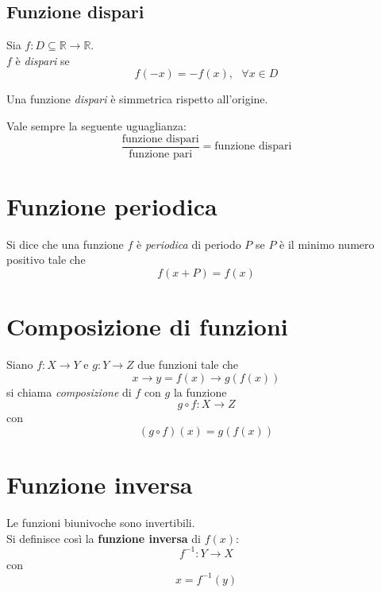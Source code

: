 \documentclass[a4paper,12pt, oneside]{book}
\begin{document}
\subsection{Funzione dispari}
\begin{definizione} Sia $f:D\subseteq \mathbb{R} \rightarrow \mathbb{R}$.\\ $f$
  è \emph{dispari} se
  \begin{equation} f(-x)=-f(x), \mbox{ } \forall x \in D
  \end{equation}
\end{definizione}
\begin{nota} Una funzione \emph{dispari} è simmetrica rispetto all'origine.
\end{nota}
\begin{shaded}
  \begin{nota} Vale sempre la seguente uguaglianza:
    $$\frac{\mbox{funzione dispari}}{\mbox{funzione pari}} = \mbox{funzione dispari}$$
  \end{nota}
\end{shaded}
\section{Funzione periodica}
\begin{definizione} Si dice che una funzione $f$ è \emph{periodica} di periodo
  $P$ se $P$ è il minimo numero positivo tale che
  \begin{equation} f(x+P) = f(x)
  \end{equation}
\end{definizione}
\section{Composizione di funzioni}
\begin{definizione} Siano $f: X \rightarrow Y$ e $g: Y \rightarrow Z$ due
  funzioni tale che
  \begin{equation} x \longrightarrow y = f(x) \longrightarrow g(f(x))
  \end{equation} si chiama \emph{composizione} di $f$ con $g$ la funzione
  \begin{equation} g \circ f: X\rightarrow Z
  \end{equation} con
  \begin{equation} (g\circ f)(x)=g(f(x))
  \end{equation}
\end{definizione}
\section{Funzione inversa}
\begin{definizione} Le funzioni biunivoche sono invertibili.\\ Si definisce così
  la \textbf{funzione inversa} di $f(x)$:
  \begin{equation} f^{-1}:Y\rightarrow X
  \end{equation} con
  \begin{equation} x = f^{-1}(y)
  \end{equation}
\end{definizione}
\end{document}
